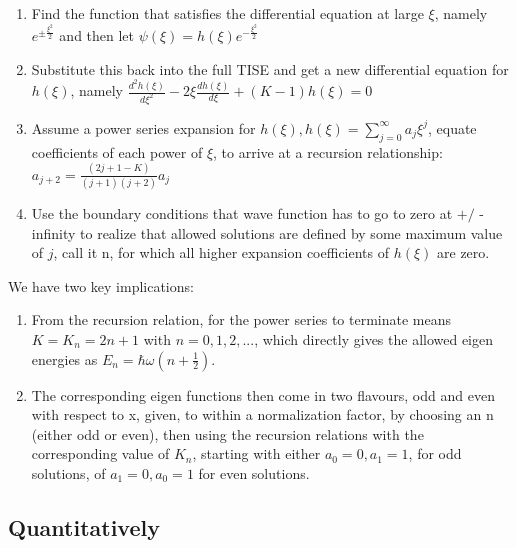 \documentclass{article}
\begin{document}
\begin{enumerate}
    \item Find the function that satisfies the differential equation at large $\xi$, namely $e^{\pm \frac{\xi^{2}}{2}}$ and then let $\psi(\xi)=h(\xi) e^{-\frac{\xi^{2}}{2}}$
    \item Substitute this back into the full TISE and get a new differential equation for $h(\xi)$, namely $\frac{d^{2} h(\xi)}{d \xi^{2}}-2 \xi \frac{d h(\xi)}{d \xi}+(K-1) h(\xi)=0$
    \item Assume a power series expansion for $h(\xi), h(\xi)=\sum_{j=0}^{\infty} a_{j} \xi^{j}$, equate coefficients of each power of $\xi$, to arrive at a recursion relationship: $a_{j+2}=\frac{(2 j+1-K)}{(j+1)(j+2)} a_{j}$
    
    \item Use the boundary conditions that wave function has to go to zero at $+/$ - infinity to realize that allowed solutions are defined by some maximum value of $j$, call it $\mathrm{n}$, for which all higher expansion coefficients of $h(\xi)$ are zero.
\end{enumerate}

We have two key implications:

\begin{enumerate}
    \item From the recursion relation, for the power series to terminate means $K = K_n = 2n+1$ with $n=0,1,2,...$, which directly gives the allowed eigen energies as $E_n = \hbar \omega(n + \frac{1}{2})$. 
    
    \item The corresponding eigen functions then come in two flavours, odd and even with respect to x, given, to within a normalization factor, by choosing an n (either odd or even), then using the recursion relations with the corresponding value of $K_n$, starting with either $a_0 = 0, a_1 = 1$, for odd solutions, of $a_1 = 0, a_0 = 1$ for even solutions. 
\end{enumerate}


\subsection{Quantitatively}
\end{document}
